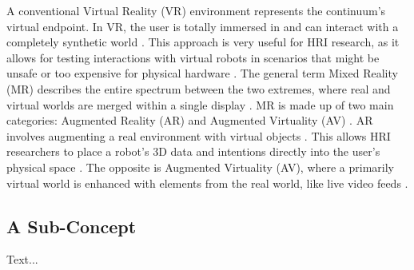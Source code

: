 A conventional Virtual Reality (VR) environment represents the continuum's virtual endpoint. In VR, the user is totally immersed in and can interact with a completely synthetic world \cite{MK94}. This approach is very useful for HRI research, as it allows for testing interactions with virtual robots in scenarios that might be unsafe or too expensive for physical hardware \cite{Walker2023}. The general term Mixed Reality (MR) describes the entire spectrum between the two extremes, where real and virtual worlds are merged within a single display \cite{MK94}. MR is made up of two main categories: Augmented Reality (AR) and Augmented Virtuality (AV) \cite{MK94, MV20}. AR involves augmenting a real environment with virtual objects \cite{MK94}. This allows HRI researchers to place a robot's 3D data and intentions directly into the user's physical space \cite{Walker2023}. The opposite is Augmented Virtuality (AV), where a primarily virtual world is enhanced with elements from the real world, like live video feeds \cite{MK94}.


\subsection{A Sub-Concept}
\label{ssec:sub_concept}
Text...
